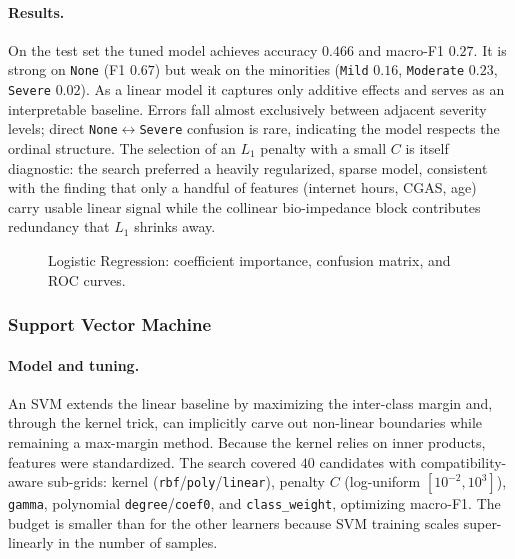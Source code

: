 \paragraph{Results.} On the test set the tuned model achieves accuracy $0.466$ and macro-F1 $0.27$. It is strong on \texttt{None} (F1 $0.67$) but weak on the minorities (\texttt{Mild} $0.16$, \texttt{Moderate} $0.23$, \texttt{Severe} $0.02$). As a linear model it captures only additive effects and serves as an interpretable baseline. Errors fall almost exclusively between adjacent severity levels; direct \texttt{None}$\leftrightarrow$\texttt{Severe} confusion is rare, indicating the model respects the ordinal structure. The selection of an $L_1$ penalty with a small $C$ is itself diagnostic: the search preferred a heavily regularized, sparse model, consistent with the finding that only a handful of features (internet hours, CGAS, age) carry usable linear signal while the collinear bio-impedance block contributes redundancy that $L_1$ shrinks away.

\begin{figure}[h]
    \centering
    \caption{Logistic Regression: coefficient importance, confusion matrix, and ROC curves.}
    \label{fig:cmi_logreg}
\end{figure}

\subsubsection{Support Vector Machine}
\paragraph{Model and tuning.} An SVM \cite{sklearn} extends the linear baseline by maximizing the inter-class margin and, through the kernel trick, can implicitly carve out non-linear boundaries while remaining a max-margin method. Because the kernel relies on inner products, features were standardized. The search covered $40$ candidates with compatibility-aware sub-grids: kernel (\texttt{rbf}/\texttt{poly}/\texttt{linear}), penalty $C$ (log-uniform $[10^{-2},10^{3}]$), \texttt{gamma}, polynomial \texttt{degree}/\texttt{coef0}, and \texttt{class\_weight}, optimizing macro-F1. The budget is smaller than for the other learners because SVM training scales super-linearly in the number of samples.
